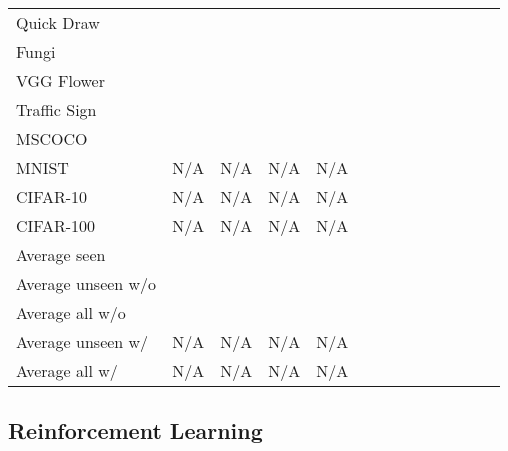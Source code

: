 \begin{table*}[t!]
{\begin{tabular}{lccccccccccccc}
    Quick Draw &\quad\;  &\quad\;  &\quad\;  &\quad\;  &\quad\;  &\quad\;  &\quad\;  &\quad\; \\
    Fungi &\quad\;  &\quad\;  &\quad\;  &\quad\;  &\quad\;  &\quad\;  &\quad\;  &\quad\; \\
    VGG Flower &\quad\;  &\quad\;  &\quad\;  &\quad\;  &\quad\;  &\quad\;  &\quad\;  &\quad\; \\
    \midrule
    Traffic Sign &\quad\;  &\quad\;  &\quad\;  &\quad\;  &\quad\;  &\quad\;  &\quad\;  &\quad\; \\
    MSCOCO &\quad\;  &\quad\;  &\quad\;  &\quad\;  &\quad\;  &\quad\;  &\quad\;  &\quad\; \\
    MNIST &\quad\; N/A &\quad\; N/A &\quad\; N/A &\quad\; N/A &\quad\;  &\quad\;  &\quad\;  &\quad\; \\
    CIFAR-10 &\quad\; N/A &\quad\; N/A &\quad\; N/A &\quad\; N/A &\quad\;  &\quad\;  &\quad\;  &\quad\; \\
    CIFAR-100 &\quad\; N/A &\quad\; N/A &\quad\; N/A &\quad\; N/A &\quad\;  &\quad\;  &\quad\;  &\quad\; \\
    \midrule
    Average seen &\quad\;  &\quad\;  &\quad\;  &\quad\;  &\quad\;  &\quad\;  &\quad\;  &\quad\; \\
    \midrule
    Average unseen w/o  &\quad\;  &\quad\;  &\quad\;  &\quad\;  &\quad\;  &\quad\;  &\quad\;  &\quad\; \\
    Average all w/o  &\quad\;  &\quad\;  &\quad\;  &\quad\;  &\quad\;  &\quad\;  &\quad\;  &\quad\; \\
    \midrule
    Average unseen w/  &\quad\; N/A &\quad\; N/A &\quad\; N/A &\quad\; N/A &\quad\;  &\quad\;  &\quad\;  &\quad\; \\
    Average all w/  &\quad\; N/A &\quad\; N/A &\quad\; N/A &\quad\; N/A &\quad\;  &\quad\;  &\quad\;  &\quad\; \\
    \bottomrule
  \end{tabular}
  }
  \label{tab:all_metadataset}
\end{table*}


\subsection{Reinforcement Learning}
